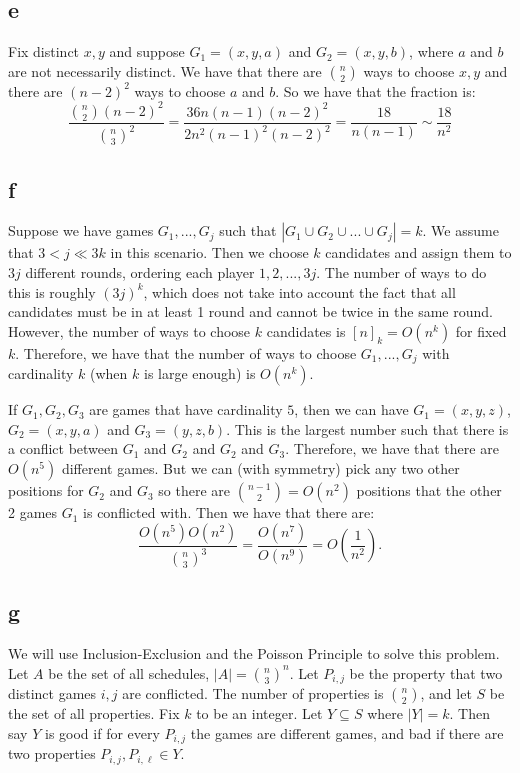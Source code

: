 \documentclass[]{article}
\theoremstyle{definition}
\numberwithin{theorem}{section}
\numberwithin{equation}{section}
\begin{document}
\subsection{e}
Fix distinct $x, y$ and suppose $G_1 = (x, y, a)$ and $G_2 = (x, y, b)$, where $a $ and $b$ are not necessarily distinct. We have that there are $\binom{n}{2}$ ways to choose $x,y$ and there are $(n-2)^2$ ways to choose $a$ and $b$. So we have that the fraction is:
\begin{equation}
	\frac{\binom{n}{2} (n - 2)^2}{\binom{n}{3}^2} = \frac{36 n (n-1) (n-2)^2 }{2 n^2 (n-1)^2(n-2)^2} = \frac{18}{n (n-1)} \sim \frac{18}{n^2}
\end{equation}

\subsection{f}
Suppose we have games $G_1, ..., G_j$ such that $|G_1 \cup G_2 \cup ... \cup G_j| = k$. We assume that $3 < j \ll 3k$ in this scenario. Then we choose $k$ candidates and assign them to $3j$ different rounds, ordering each player $1, 2, ..., 3j$. The number of ways to do this is roughly $(3j)^k$, which does not take into account the fact that all candidates must be in at least 1 round and cannot be twice in the same round. However, the number of ways to choose $k$ candidates is $[n]_k  = O(n^k)$ for fixed $k$. Therefore, we have that the number of ways to choose $G_1, ..., G_j$ with cardinality $k$ (when $k$ is large enough) is $O(n^k)$. 
\par
If $G_1, G_2, G_3$ are games that have cardinality $5$, then we can have $G_1 = (x, y, z)$, $G_2 = (x, y, a)$ and $G_3 = (y, z, b)$. This is the largest number such that there is a conflict between $G_1$ and $G_2$ and $G_2$ and $G_3$. Therefore, we have that there are $O(n^5)$ different games. But we can (with symmetry) pick any two other positions for $G_2$ and $G_3$ so there are $\binom{n - 1 }{2} = O(n^2)$ positions that the other 2 games $G_1$ is conflicted with. Then we have that there are:
\begin{equation}
	\frac{O(n^5) O(n^2)}{\binom{n}{3}^3} = \frac{O(n^7)}{O(n^9)} = O(\frac{1}{n^2}).
\end{equation}

\subsection{g}
We will use Inclusion-Exclusion and the Poisson Principle to solve this problem. 
Let $A$ be the set of all schedules, $|A| = \binom{n}{3}^n$. 
Let $P_{i,j}$ be the property that two distinct games $i, j$ are conflicted. The number of properties is $\binom{n}{2}$, and let $S$ be the set of all properties. 
Fix $k$ to be an integer. 
Let $Y \subseteq S$ where $|Y| = k$. Then say $Y$ is good if for every $P_{i, j}$ the games are different games, and bad if there are two properties $P_{i, j}, P_{i, \ell} \in Y$. 
\end{document}
